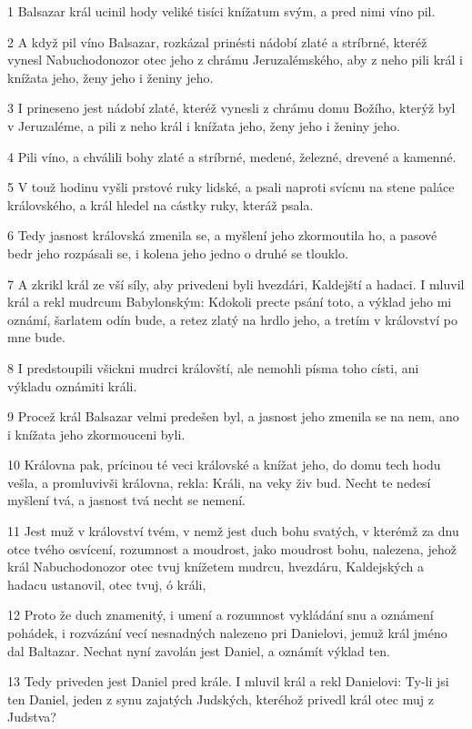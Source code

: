 \par 1 Balsazar král ucinil hody veliké tisíci knížatum svým, a pred nimi víno pil.
\par 2 A když pil víno Balsazar, rozkázal prinésti nádobí zlaté a stríbrné, kteréž vynesl Nabuchodonozor otec jeho z chrámu Jeruzalémského, aby z neho pili král i knížata jeho, ženy jeho i ženiny jeho.
\par 3 I prineseno jest nádobí zlaté, kteréž vynesli z chrámu domu Božího, kterýž byl v Jeruzaléme, a pili z neho král i knížata jeho, ženy jeho i ženiny jeho.
\par 4 Pili víno, a chválili bohy zlaté a stríbrné, medené, železné, drevené a kamenné.
\par 5 V touž hodinu vyšli prstové ruky lidské, a psali naproti svícnu na stene paláce královského, a král hledel na cástky ruky, kteráž psala.
\par 6 Tedy jasnost královská zmenila se, a myšlení jeho zkormoutila ho, a pasové bedr jeho rozpásali se, i kolena jeho jedno o druhé se tlouklo.
\par 7 A zkrikl král ze vší síly, aby privedeni byli hvezdári, Kaldejští a hadaci. I mluvil král a rekl mudrcum Babylonským: Kdokoli precte psání toto, a výklad jeho mi oznámí, šarlatem odín bude, a retez zlatý na hrdlo jeho, a tretím v království po mne bude.
\par 8 I predstoupili všickni mudrci královští, ale nemohli písma toho císti, ani výkladu oznámiti králi.
\par 9 Procež král Balsazar velmi predešen byl, a jasnost jeho zmenila se na nem, ano i knížata jeho zkormouceni byli.
\par 10 Královna pak, prícinou té veci královské a knížat jeho, do domu tech hodu vešla, a promluvivši královna, rekla: Králi, na veky živ bud. Necht te nedesí myšlení tvá, a jasnost tvá necht se nemení.
\par 11 Jest muž v království tvém, v nemž jest duch bohu svatých, v kterémž za dnu otce tvého osvícení, rozumnost a moudrost, jako moudrost bohu, nalezena, jehož král Nabuchodonozor otec tvuj knížetem mudrcu, hvezdáru, Kaldejských a hadacu ustanovil, otec tvuj, ó králi,
\par 12 Proto že duch znamenitý, i umení a rozumnost vykládání snu a oznámení pohádek, i rozvázání vecí nesnadných nalezeno pri Danielovi, jemuž král jméno dal Baltazar. Nechat nyní zavolán jest Daniel, a oznámít výklad ten.
\par 13 Tedy priveden jest Daniel pred krále. I mluvil král a rekl Danielovi: Ty-li jsi ten Daniel, jeden z synu zajatých Judských, kteréhož privedl král otec muj z Judstva?
